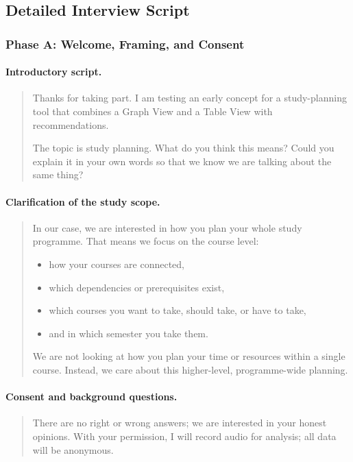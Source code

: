 \subsection{Detailed Interview Script}
\label{app:formative-script}

\subsubsection{Phase A: Welcome, Framing, and Consent}

\paragraph{Introductory script.}
\begin{quote}
Thanks for taking part. I am testing an early concept for a study-planning tool that combines a Graph View and a Table View with recommendations.

The topic is study planning. What do you think this means? Could you explain it in your own words so that we know we are talking about the same thing?
\end{quote}

\paragraph{Clarification of the study scope.}
\begin{quote}
In our case, we are interested in how you plan your whole study programme. That means we focus on the course level:
\begin{itemize}
    \item how your courses are connected,
    \item which dependencies or prerequisites exist,
    \item which courses you want to take, should take, or have to take,
    \item and in which semester you take them.
\end{itemize}
We are not looking at how you plan your time or resources within a single course. Instead, we care about this higher-level, programme-wide planning.
\end{quote}

\paragraph{Consent and background questions.}
\begin{quote}
There are no right or wrong answers; we are interested in your honest opinions. With your permission, I will record audio for analysis; all data will be anonymous.
\end{quote}

